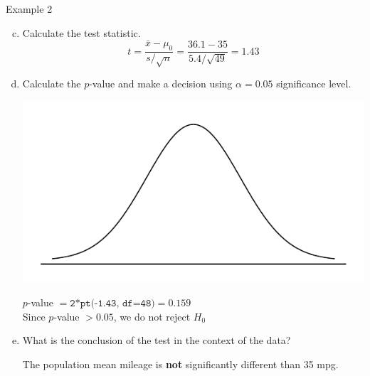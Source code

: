 \documentclass[fleqn, 10pt]{beamer}\usepackage[]{graphicx}\usepackage[]{color}
\begin{document}
\begin{frame}{Example 2}
\begin{enumerate}[(a)]
\setcounter{enumi}{2}
\item Calculate the test statistic.
{\color{blue}
$$t = \frac{\bar{x} - \mu_0}{s / \sqrt{n}} = 
\frac{36.1 - 35}{5.4 / \sqrt{49}} = 1.43$$}

\item Calculate the $p$-value and make a decision using $\alpha = 0.05$ significance level.

\smallskip
\begin{multicols}{2}
\includegraphics[scale=0.35]{figure/norm_draw.pdf}
\vspace{0.75cm}
\columnbreak

{\color{blue}
$p$-value $= \texttt{2*pt(-1.43, df=48)} = 0.159$\\
Since $p$-value $>0.05$, we do not reject $H_0$}
\end{multicols}

\item What is the conclusion of the test in the context of the data?

\medskip
{\color{blue} The population mean mileage is \textbf{not} significantly different than 35 mpg.}
\end{enumerate}
\end{frame}
\end{document}
